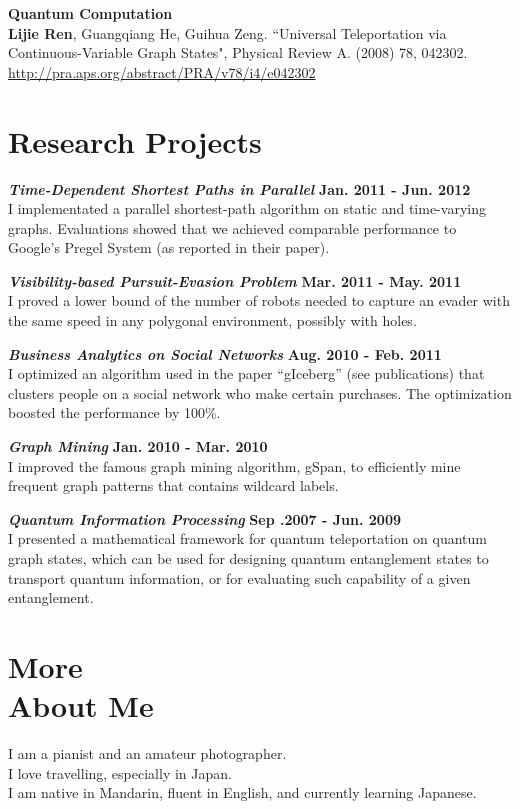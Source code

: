 \documentclass[margin,line]{res}
\begin{document}
\begin{resume}
{\bf Quantum Computation}\\
{\bf{Lijie Ren}}, Guangqiang He, Guihua Zeng. ``Universal Teleportation via Continuous-Variable Graph States", Physical Review A. (2008) 78, 042302.\\\url{http://pra.aps.org/abstract/PRA/v78/i4/e042302}

\section{\sc Research Projects}
\vspace{-.1cm}
{\bf{\em Time-Dependent Shortest Paths in Parallel}}  \hfill {\bf Jan. 2011 - Jun. 2012}\\
I implementated a parallel shortest-path algorithm on static and time-varying graphs. Evaluations showed that we achieved comparable performance to Google's Pregel System (as reported in their paper).

{\bf{\em Visibility-based Pursuit-Evasion Problem}}  \hfill {\bf Mar. 2011 - May. 2011}\\
I proved a lower bound of the number of robots needed to capture an evader with the same speed in any polygonal environment, possibly with holes.

{\bf{\em Business Analytics on Social Networks}}  \hfill {\bf Aug. 2010 - Feb. 2011}\\
I optimized an algorithm used in the paper ``gIceberg'' (see publications) that clusters people on a social network who make certain purchases. The optimization boosted the performance by 100\%.

{\bf{\em Graph Mining}}  \hfill {\bf Jan. 2010 - Mar. 2010}\\
I improved the famous graph mining algorithm, gSpan, to efficiently mine frequent graph patterns that contains wildcard labels.

{\bf{\em Quantum Information Processing}} \hfill {\bf Sep .2007 - Jun. 2009}\\
I presented a mathematical framework for quantum teleportation on quantum graph states, which can be used for designing quantum entanglement states to transport quantum information, or for evaluating such capability of a given entanglement.

\section{\sc More \\About Me}
I am a pianist and an amateur photographer.\\
I love travelling, especially in Japan.\\
I am native in Mandarin, fluent in English, and currently learning Japanese.

\end{resume}
\end{document}
